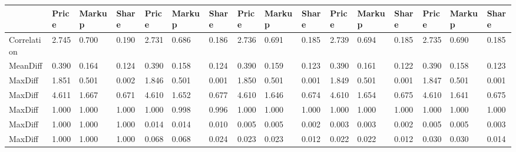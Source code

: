 \begin{table}[htbp]
\begin{tabular}{llllllllllllllll} \hline \hline
 & Price  & Markup  & Share  & Price  & Markup  & Share  & Price  & Markup  & Share  & Price  & Markup  & Share  & Price  & Markup  & Share  \\  \hline 
Correlation &     2.745 &     0.700 &     0.190 &     2.731 &     0.686 &     0.186 &     2.736 &     0.691 &     0.185 &     2.739 &     0.694 &     0.185 &     2.735 &     0.690 &     0.185 \\  
MeanDiff &     0.390 &     0.164 &     0.124 &     0.390 &     0.158 &     0.124 &     0.390 &     0.159 &     0.123 &     0.390 &     0.161 &     0.122 &     0.390 &     0.158 &     0.123 \\  
MaxDiff &     1.851 &     0.501 &     0.002 &     1.846 &     0.501 &     0.001 &     1.850 &     0.501 &     0.001 &     1.849 &     0.501 &     0.001 &     1.847 &     0.501 &     0.001 \\  
MaxDiff &     4.611 &     1.667 &     0.671 &     4.610 &     1.652 &     0.677 &     4.610 &     1.646 &     0.674 &     4.610 &     1.654 &     0.675 &     4.610 &     1.641 &     0.675 \\  
MaxDiff &     1.000 &     1.000 &     1.000 &     1.000 &     0.998 &     0.996 &     1.000 &     1.000 &     1.000 &     1.000 &     1.000 &     1.000 &     1.000 &     1.000 &     1.000 \\  
MaxDiff &     1.000 &     1.000 &     1.000 &     0.014 &     0.014 &     0.010 &     0.005 &     0.005 &     0.002 &     0.003 &     0.003 &     0.002 &     0.005 &     0.005 &     0.003 \\  
MaxDiff &     1.000 &     1.000 &     1.000 &     0.068 &     0.068 &     0.024 &     0.023 &     0.023 &     0.012 &     0.022 &     0.022 &     0.012 &     0.030 &     0.030 &     0.014 \\  
\hline \hline \end{tabular}
\end{table}
